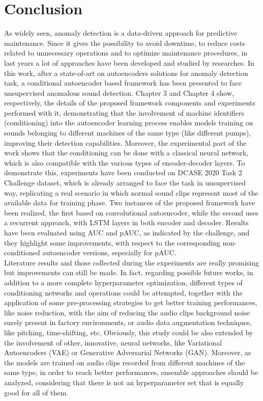 \chapter{Conclusion}
As widely seen, anomaly detection is a data-driven approach for predictive maintenance. Since it gives the possibility to avoid downtime, to reduce costs related to unnecessary operations and to optimize maintenance procedures, in last years a lot of approaches have been developed and studied by researches. In this work, after a state-of-art on autoencoders solutions for anomaly detection task, a conditional autoencoder based framework has been presented to face unsupervised anomalous sound detection. Chapter 3 and Chapter 4 show, respectively, the details of the proposed framework components and experiments performed with it, demonstrating that the involvement of machine identifiers (conditioning) into the autoencoder learning process enables models training on sounds belonging to different machines of the same type (like different pumps), improving their detection capabilities. Moreover, the experimental part of the work shows that the conditioning can be done with a classical neural network, which is also compatible with the various types of encoder-decoder layers. To demonstrate this, experiments have been conducted on DCASE 2020 Task 2 Challenge dataset, which is already arranged to face the task in unsupervised way, replicating a real scenario in which normal sound clips represent most of the available data for training phase. Two instances of the proposed framework have been realized, the first based on convolutional autoencoder, while the second uses a recurrent approach, with LSTM layers in both encoder and decoder. Results have been evaluated using AUC and pAUC, as indicated by the challenge, and they highlight some improvements, with respect to the corresponding non-conditioned autoencoder versions, especially for pAUC.\\
Literature results and those collected during the experiments are really promising but improvements can still be made. In fact, regarding possible future works, in addition to a more complete hyperparameter optimization, different types of conditioning networks and operations could be attempted, together with the application of some pre-processing strategies to get better training performances, like noise reduction, with the aim of reducing the audio clips background noise surely present in factory environments, or audio data augmentation techniques, like pitching, time-shifting, etc. Obviously, this study could be also extended by the involvement of other, innovative, neural networks, like Variational Autoencoders (VAE) or Generative Adversarial Networks (GAN). Moreover, as the models are trained on audio clips recorded from different machines of the same type, in order to reach better performances, ensemble approaches should be analyzed, considering that there is not an hyperparameter set that is equally good for all of them.\\
